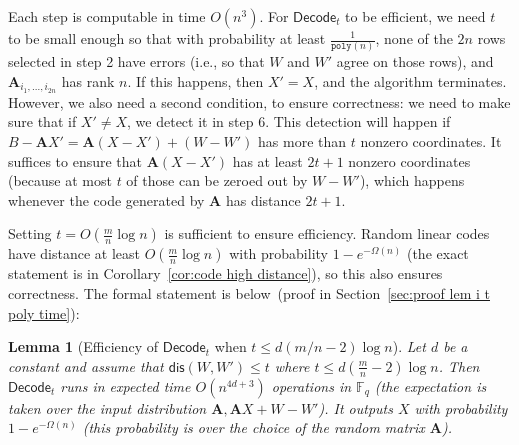 \documentclass[11pt]{article}
\newcommand{\secref}[1]{\mbox{Section~\ref{#1}}}
\newcommand{\corref}[1]{\mbox{Corollary~\ref{#1}}}
\newcommand{\lemref}[1]{\mbox{Lemma~\ref{#1}}}
\newcommand{\class}[1]{{\ensuremath{\mathsf{#1}}}}
\newcommand{\vect}[1]{\ensuremath{\textbf{#1}}}
\newcommand{\Fq}{\ensuremath{\mathbb{F}_q}}
\newcommand{\dis}{\ensuremath{\mathsf{dis}}}
\newcommand{\decode}{\ensuremath{\mathsf{Decode}}}
\newcommand{\poly}{\ensuremath{\mathtt{poly}}\xspace}
\newcommand{\distLWE}{\ensuremath{\class{dist\mbox{-}LWE}}}
\newtheorem{lemma}[theorem]{Lemma}
\newcommand{\authnote}[2]{{\textcolor{red}{\textsf{#1 notes: }\textcolor{blue}{ #2}}\marginpar{\textcolor{red}{\textbf{!!!!!}}}}}
\newcommand{\authnote}[2]{}
\newcommand{\lnote}[1]{{\authnote{Leo}{#1}}}
\newcommand{\vA}{\vect{A}}
\begin{document}
Each step is computable in time $O(n^3)$. 
For $\decode_t$ to be efficient, we need $t$ to be small enough so that  with probability at least $\frac{1}{\poly(n)}$, none of the $2n$ rows  selected  in step 2 have errors (i.e., so that $W$ and $W'$ agree on those rows), and $\vA_{i_1,...,i_{2n}}$ has rank  $n$.  If this happens, then $X'=X$, and the algorithm terminates.  However, we also need a second condition, to ensure correctness: we need to make sure that if $X'\neq X$, we detect it in step 6.  This detection will happen if $B-\vA X' = \vA (X-X')+(W-W')$ has more than $t$ nonzero coordinates.  It suffices to ensure that $\vA (X-X')$ has at least $2t+1$ nonzero coordinates (because at most $t$ of those can be zeroed out by $W-W'$), which happens whenever the code generated by $\vA$ has distance $2t+1$.

Setting $t = O(\frac{m}{n}\log n)$ is sufficient to ensure efficiency.    Random linear codes have distance at least $O(\frac{m}{n}\log n)$ with probability $1-e^{-\Omega(n)}$ (the exact statement is in \corref{cor:code high distance}), so this also ensures correctness.
The formal statement is below~(proof in \secref{sec:proof lem i t poly time}):
\begin{lemma}[Efficiency of $\decode_t$ when $t\leq d (m/n-2)\log n$]
\label{lem:i t poly time}
Let $d$ be a constant and assume that $\dis(W, W')\leq t$ where $t\leq d(\frac{m}{n}-2)\log n$.  Then $\decode_t$ runs in expected time $O(n^{4d+3})$ operations in $\Fq$ (the expectation is taken over the input distribution $\vA, \vA X+W - W'$).  It outputs $X$ with probability $1-e^{-\Omega(n)}$ (this probability is over the choice of the random matrix  $\vA$).
\end{lemma}
\end{document}
